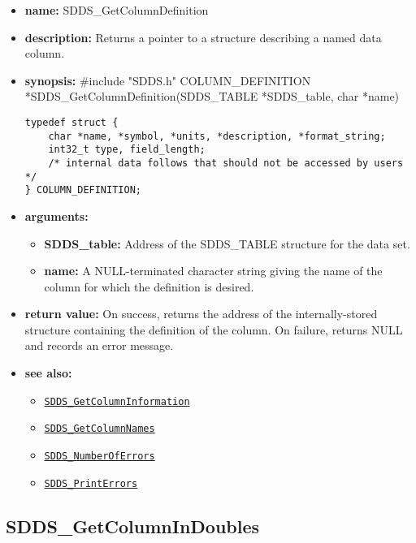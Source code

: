 \documentclass[11pt]{article}
\newcommand{\progref}[1]{\hyperref[SDDS_#1]{\tt SDDS\_#1}}
\begin{document}
\begin{itemize}
\item {\bf name:}\newline
SDDS\_GetColumnDefinition
\item {\bf description:}\newline
Returns a pointer to a structure describing a named data column.
\item {\bf synopsis:} \#include "SDDS.h"\newline
COLUMN\_DEFINITION *SDDS\_GetColumnDefinition(SDDS\_TABLE *SDDS\_table, char *name)\newline
\begin{verbatim}
typedef struct {
    char *name, *symbol, *units, *description, *format_string;
    int32_t type, field_length;
    /* internal data follows that should not be accessed by users */
} COLUMN_DEFINITION;
\end{verbatim}
\item {\bf arguments:}
\begin{itemize}
\item {\bf SDDS\_table:} Address of the SDDS\_TABLE structure for the data set.
\item {\bf name:} A NULL-terminated character string giving the name of the column for which the definition is desired.
\end{itemize}
\item {\bf return value:}\newline
On success, returns the address of the internally-stored structure containing the definition of the column. On failure, returns NULL and records an error message.
\item {\bf see also:}
\begin{itemize}
\item \progref{GetColumnInformation}
\item \progref{GetColumnNames}
\item \progref{NumberOfErrors}
\item \progref{PrintErrors}
\end{itemize}
\end{itemize}

\subsection{SDDS\_GetColumnInDoubles}
\label{SDDS_GetColumnInDoubles}
\end{document}
